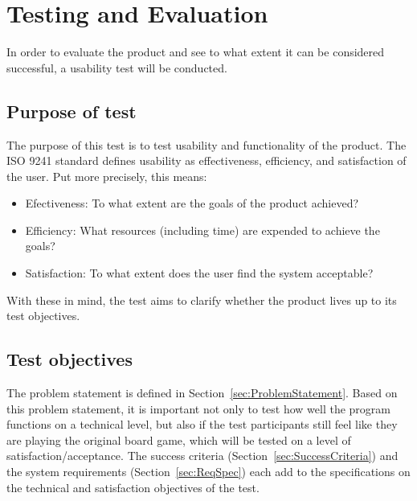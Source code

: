 \chapter{Testing and Evaluation}\label{ch:testeval}
In order to evaluate the product and see to what extent it can be considered successful, a usability test will be conducted.

\section{Purpose of test}
The purpose of this test is to test usability and functionality of the product. The ISO 9241 \citep{ISO} standard defines usability as effectiveness, efficiency, and satisfaction of the user. Put more precisely, this means:
\begin{itemize}
\item Efectiveness: To what extent are the goals of the product achieved?
\item Efficiency: What resources (including time) are expended to achieve the goals?
\item Satisfaction: To what extent does the user find the system acceptable?
\end{itemize}
With these in mind, the test aims to clarify whether the product lives up to its test objectives.

\section{Test objectives}\label{sec:TestObjectives}
The problem statement is defined in Section~\ref{sec:ProblemStatement}. Based on this problem statement, it is important not only to test how well the program functions on a technical level, but also if the test participants still feel like they are playing the original board game, which will be tested on a level of satisfaction/acceptance.
The success criteria (Section~\ref{sec:SuccessCriteria}) and the system requirements (Section~\ref{sec:ReqSpec}) each add to the specifications on the technical and satisfaction  objectives of the test.

